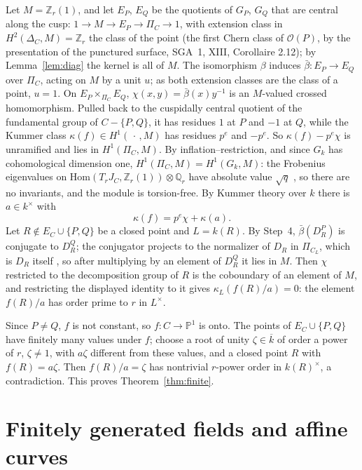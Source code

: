 \documentclass[11pt]{amsart}
\theoremstyle{remark}
\newcommand{\Z}{\mathbb Z}
\newcommand{\Q}{\mathbb Q}
\begin{document}
Let $M=\Z_r(1)$, and let $E_P$, $E_Q$ be the quotients of $G_P$, $G_Q$ that are central along the cusp: $1\to M\to E_P\to\Pi_C\to1$, with extension class in $H^2(\Delta_C,M)=\Z_r$ the class of the point (the first Chern class of $\mathcal O(P)$, by the presentation of the punctured surface, SGA~1, XIII, Corollaire 2.12); by Lemma~\ref{lem:diag} the kernel is all of $M$. The isomorphism $\beta$ induces $\bar\beta\colon E_P\to E_Q$ over $\Pi_C$, acting on $M$ by a unit $u$; as both extension classes are the class of a point, $u=1$. On $E_P\times_{\Pi_C}E_Q$, $\chi(x,y)=\bar\beta(x)y^{-1}$ is an $M$-valued crossed homomorphism. Pulled back to the cuspidally central quotient of the fundamental group of $C-\{P,Q\}$, it has residues $1$ at $P$ and $-1$ at $Q$, while the Kummer class $\kappa(f)\in H^1(\,\cdot\,,M)$ has residues $p^e$ and $-p^e$. So $\kappa(f)-p^e\chi$ is unramified and lies in $H^1(\Pi_C,M)$. By inflation--restriction, and since $G_k$ has cohomological dimension one, $H^1(\Pi_C,M)=H^1(G_k,M)$: the Frobenius eigenvalues on $\mathrm{Hom}(T_rJ_C,\Z_r(1))\otimes\Q_r$ have absolute value $\sqrt q$ \cite[Th\'eor\`eme 1.6]{WeilI}, so there are no invariants, and the module is torsion-free. By Kummer theory over $k$ there is $a\in k^\times$ with
\[
 \kappa(f)=p^e\chi+\kappa(a).
\]
Let $R\notin E_C\cup\{P,Q\}$ be a closed point and $L=k(R)$. By Step~4, $\bar\beta(D_R^P)$ is conjugate to $D_R^Q$; the conjugator projects to the normalizer of $D_R$ in $\Pi_{C_L}$, which is $D_R$ itself \cite[Lemma 1.7]{ST09}, so after multiplying by an element of $D_R^Q$ it lies in $M$. Then $\chi$ restricted to the decomposition group of $R$ is the coboundary of an element of $M$, and restricting the displayed identity to it gives $\kappa_L(f(R)/a)=0$: the element $f(R)/a$ has order prime to $r$ in $L^\times$.

Since $P\ne Q$, $f$ is not constant, so $f\colon C\to\mathbb P^1$ is onto. The points of $E_C\cup\{P,Q\}$ have finitely many values under $f$; choose a root of unity $\zeta\in\overline k$ of order a power of $r$, $\zeta\ne1$, with $a\zeta$ different from these values, and a closed point $R$ with $f(R)=a\zeta$. Then $f(R)/a=\zeta$ has nontrivial $r$-power order in $k(R)^\times$, a contradiction. This proves Theorem~\ref{thm:finite}.

\section{Finitely generated fields and affine curves}\label{sec:open}
\end{document}
